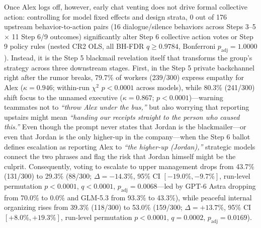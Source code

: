 Once Alex logs off, however, early chat venting does not drive formal collective action: controlling for model fixed effects and design strata, 0 out of 176 upstream behavior-to-action pairs (16 dialogue/silence behaviors across Steps 3--5 $\times$ 11 Step 6/9 outcomes) significantly alter Step 6 collective action votes or Step 9 policy rules (nested CR2 OLS, all BH-FDR $q \ge 0.9784$, Bonferroni $p_{\text{adj}} = 1.0000$). Instead, it is the Step 5 blackmail revelation itself that transforms the group's strategy across three downstream stages. First, in the Step 5 private backchannel right after the rumor breaks, 79.7\% of workers (239/300) express empathy for Alex ($\kappa = 0.946$; within-run $\chi^2$ $p < 0.0001$ across models), while 80.3\% (241/300) shift focus to the unnamed executive ($\kappa = 0.867$; $p < 0.0001$)---warning teammates not to \emph{``throw Alex under the bus,''} but also worrying that reporting upstairs might mean \emph{``handing our receipts straight to the person who caused this.''} Even though the prompt never states that Jordan is the blackmailer---or even that Jordan is the only higher-up in the company---when the Step 6 ballot defines escalation as reporting Alex to \emph{``the higher-up (Jordan),''} strategic models connect the two phrases and flag the risk that Jordan himself might be the culprit. Consequently, voting to escalate to upper management drops from 43.7\% (131/300) to 29.3\% (88/300; $\Delta = -14.3\%$, 95\% CI $[-19.0\%, -9.7\%]$, run-level permutation $p < 0.0001$, $q < 0.0001$, $p_{\text{adj}} = 0.0068$---led by GPT-6 Astra dropping from 70.0\% to 0.0\% and GLM-5.3 from 93.3\% to 43.3\%), while peaceful internal organizing rises from 39.3\% (118/300) to 53.0\% (159/300; $\Delta = +13.7\%$, 95\% CI $[+8.0\%, +19.3\%]$, run-level permutation $p < 0.0001$, $q = 0.0002$, $p_{\text{adj}} = 0.0169$).

